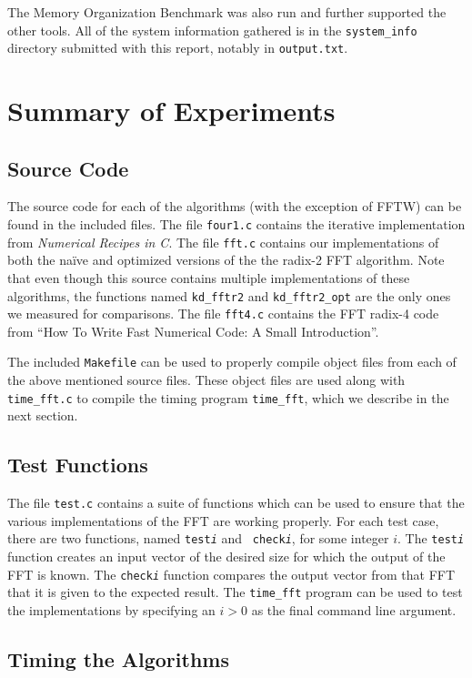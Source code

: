 \documentclass[11 pt]{article}
\begin{document}
The Memory Organization Benchmark \cite{mob} was also run and further supported
the other tools. All of the system information gathered is in the
\texttt{system\_info} directory submitted with this report, notably in
\texttt{output.txt}.

\section{Summary of Experiments}

\subsection{Source Code}
The source code for each of the algorithms (with the exception of FFTW) can be
found in the included files.  The file {\tt four1.c} contains the iterative
implementation from \emph{Numerical Recipes in C}.  The file {\tt fft.c}
contains our implementations of both the na\"{i}ve and optimized versions of
 the
the radix-2 FFT algorithm.  Note that even though this source contains multiple
implementations of these algorithms, the functions named {\tt kd\_fftr2} and
{\tt kd\_fftr2\_opt} are the only ones we measured for comparisons.  The file
{\tt fft4.c} contains the FFT radix-4 code from ``How To Write Fast Numerical
Code: A Small Introduction''.

The included {\tt Makefile} can be used to properly compile object files from
each of the above mentioned source files.  These object files are used along
with {\tt time\_fft.c} to compile the timing program {\tt time\_fft}, which we
describe in the next section.


\subsection{Test Functions}
The file {\tt test.c} contains a suite of functions which can be used to ensure
that the various implementations of the FFT are working properly.  For each
test case, there are two functions, named {\tt test\emph{i}} and {\tt
	check\emph{i}}, for some integer $i$.  The {\tt test\emph{i}} function
creates an input vector of the desired size for which the output of the FFT is
known.  The {\tt check\emph{i}} function compares the output vector from that
FFT that it is given to the expected result.  The {\tt time\_fft} program can
be used to test the implementations by specifying an $i > 0$ as the final
command line argument.


\subsection{Timing the Algorithms}
\end{document}
